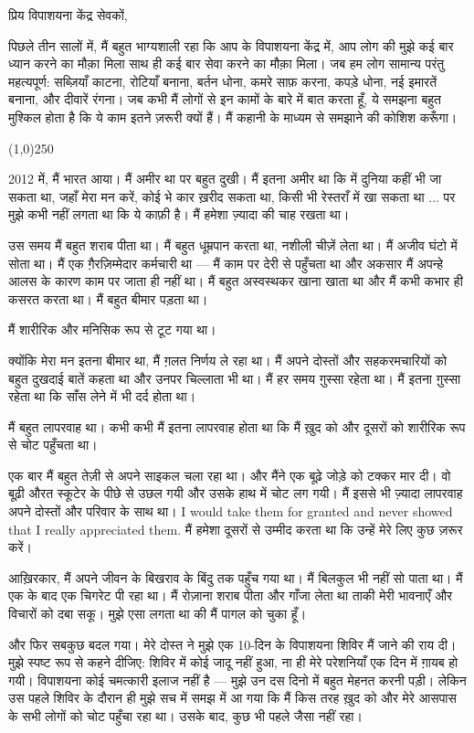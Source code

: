 \documentclass{article}
\begin{document}
प्रिय विपाशयना केंद्र सेवकों,

पिछले तीन सालों में, मैं बहुत भाग्यशाली रहा कि आप के विपाशयना केंद्र में, आप लोग की मुझे कई बार ध्यान करने का मौक़ा मिला साथ
ही कई बार सेवा करने का मौक़ा मिला। जब हम लोग सामान्य परंतु महत्यपूर्ण: सब्ज़ियाँ काटना, रोटियाँ
बनाना, बर्तन धोना, कमरे साफ़ करना, कपड़े धोना, नई इमारतें बनाना, और दीवारें रंगना। जब कभी मैं
लोगों से इन कामों के बारे में बात करता हूँ, ये समझना बहुत मुश्किल होता है कि ये काम इतने ज़रूरी क्यों हैं।
मैं कहानी के माध्यम से समझाने की कोशिश करूँगा।


\begin{center}
\line(1,0){250}
\end{center}

2012 में, मैं भारत आया। मैं अमीर था पर बहुत दुखी। मैं इतना अमीर था कि में दुनिया कहीं भी जा सकता
था, जहाँ मेरा मन करें, कोई भे कार ख़रीद सकता था, किसी भी रेस्तराँ में खा सकता था ... पर मुझे कभी
नहीं लगता था कि ये काफ़ी है। मैं हमेशा ज़्यादा की चाह रखता था।

उस समय मैं बहुत शराब पीता था। मैं बहुत धूम्रपान करता था, नशीली चीज़ें लेता था। मैं अजीव घंटो में सोता
था। मैं एक ग़ैरज़िम्मेदार कर्मचारी था --- मैं काम पर देरी से पहुँचता था और अकसार मैं अपन्हे आलस के कारण
काम पर जाता ही नहीं था। मैं बहुत अस्वस्थकर खाना खाता था और मैं कभी कभार ही कसरत करता था। मैं
बहुत बीमार पड़ता था।

मैं शारीरिक और मनिसिक रूप से टूट गया था।

क्योंकि मेरा मन इतना बीमार था, मैं ग़लत निर्णय ले रहा था। मैं अपने दोस्तों और सहकरमचारियों को बहुत
दुखदाई बातें कहता था और उनपर चिल्लाता भी था। मैं हर समय ग़ुस्सा रहेता था। मैं इतना ग़ुस्सा रहेता था
कि साँस लेने में भी दर्द होता था।

मैं बहुत लापरवाह था। कभी कभी मैं इतना लापरवाह होता था कि मैं ख़ुद को और दूसरों को शारीरिक रूप से
चोट पहुँचता था।

एक बार मैं बहुत तेज़ी से अपने साइकल चला रहा था। और मैंने एक बूढ़े जोड़े को टक्कर मार दी। वो बूढ़ी औरत
स्कूटेर के पीछे से उछल गयी और उसके हाथ में चोट लग गयी। मैं इससे भी ज़्यादा लापरवाह अपने दोस्तों और
परिवार के साथ था। I would take them for granted and never showed that I really
appreciated them. मैं हमेशा दूसरों से उम्मीद करता था कि उन्हें मेरे लिए कुछ ज़रूर करें।

आख़िरकार, मैं अपने जीवन के बिखराव के बिंदु तक पहुँच गया था। मैं बिलकुल भी नहीं सो पाता था। मैं एक के
बाद एक चिगरेट पी रहा था। मैं रोज़ाना शराब पीता और गाँजा लेता था ताकी मेरी भावनाएँ और विचारों
को दबा सकू। मुझे एसा लगता था की मैं पागल को चुका हूँ।

और फिर सबकुछ बदल गया। मेरे दोस्त ने मुझे एक 10-दिन के विपाशयना शिविर मैं जाने की राय दी। मुझे स्पष्ट
रूप से कहने दीजिए: शिविर में कोई जादू नहीं हुआ, ना ही मेरे परेशनियाँ एक दिन में ग़ायब हो गयी।
विपाशयना कोई चमत्कारी इलाज नहीं है --- मुझे उन दस दिनो में बहुत मेहनत करनी पड़ी। लेकिन उस पहले
शिविर के दौरान ही मुझे सच में समझ में आ गया कि मैं किस तरह ख़ुद को और मेरे आसपास के सभी लोगों को चोट
पहुँचा रहा था। उसके बाद, कुछ भी पहले जैसा नहीं रहा।
\end{document}
